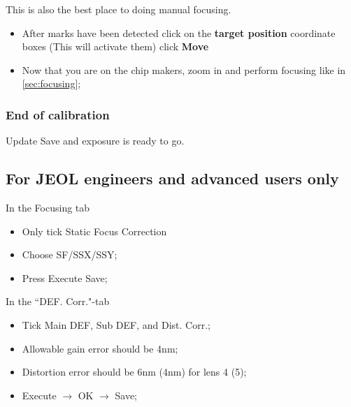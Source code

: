 \begin{framed}\noindent
  This is also the best place to doing manual focusing.
  \begin{itemize}
  \item  After  marks  have  been  detected \ira  click  on  the  \textbf{target
      position}  coordinate   boxes  (This   will  activate  them)   \ira  click
    \textbf{Move}
  \item Now that you  are on the chip makers, zoom in  and perform focusing like
    in \autoref{sec:focusing};
  \end{itemize}
\end{framed}


\subsubsection{End of calibration}
\label{sec:end-calibration}

\begin{framed}\noindent
  Update \ira Save and exposure is ready to go.
\end{framed}

\subsection{For JEOL engineers and advanced users only}

In the {Focusing} tab
\begin{itemize}
\item Only tick {Static Focus Correction}
\item Choose SF/SSX/SSY;
\item Press Execute \ira Save;
\end{itemize}
In the ``DEF. Corr."-tab
\begin{itemize}
\item Tick {Main DEF}, {Sub DEF}, and {Dist. Corr.};
\item Allowable gain error should be 4nm;
\item Distortion error should be 6nm (4nm) for lens 4 (5);
\item Execute $\rightarrow$ OK $\rightarrow$ Save;
\end{itemize}

